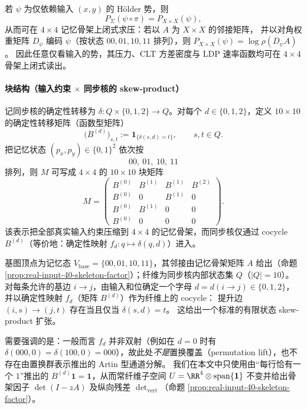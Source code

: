 \begin{corollary}[输入势的降维原则]\label{cor:real-input-40-input-potential-reduction}
若 $\psi$ 为仅依赖输入 $(x,y)$ 的 Hölder 势，则
\[
P_\Sigma(\psi\circ\pi)=P_{X\times X}(\psi),
\]
从而可在 $4\times 4$ 记忆骨架上闭式求压：若以 $A$ 为 $X\times X$ 的邻接矩阵，
并以对角权重矩阵 $D_\psi$ 编码 $\psi$（按状态 $00,01,10,11$ 排列），则
\(
P_{X\times X}(\psi)=\log\rho(D_\psi A)
\)。
因此任意仅看输入的势，其压力、CLT 方差密度与 LDP 速率函数均可在 $4\times 4$ 骨架上闭式读出。
\end{corollary}

\paragraph{块结构（输入约束 $\times$ 同步核的 skew-product）}
记同步核的确定性转移为 $\delta:Q\times\{0,1,2\}\to Q$。对每个 $d\in\{0,1,2\}$，定义 $10\times 10$ 的确定性转移矩阵（函数型矩阵）
\[
\bigl(B^{(d)}\bigr)_{s,t}:=\mathbf{1}_{\{\delta(s,d)=t\}},
\qquad s,t\in Q.
\]
把记忆状态 $(p_x,p_y)\in\{0,1\}^2$ 依次按
\[
00,\ 01,\ 10,\ 11
\]
排列，则 $M$ 可写成 $4\times 4$ 的 $10\times 10$ 块矩阵
\[
M=
\begin{pmatrix}
B^{(0)} & B^{(1)} & B^{(1)} & B^{(2)}\\
B^{(0)} & 0   & B^{(1)} & 0\\
B^{(0)} & B^{(1)} & 0   & 0\\
B^{(0)} & 0   & 0   & 0
\end{pmatrix}.
\]
该表示把全部真实输入约束压缩到 $4\times 4$ 的记忆骨架，而同步核仅通过 cocycle $B^{(d)}$（等价地：确定性映射 $f_d:q\mapsto\delta(q,d)$）进入。

\begin{remark}\label{rem:real-input-40-deterministic-lift}
基图顶点为记忆态 \(V_{\mathrm{base}}=\{00,01,10,11\}\)，其邻接由记忆骨架矩阵 \(A\) 给出（命题 \ref{prop:real-input-40-skeleton-factor}）；纤维为同步核内部状态集 \(Q\)（\(|Q|=10\)）。
对每条允许的基边 \(i\to j\)，由输入和位确定一个字母 \(d=d(i\to j)\in\{0,1,2\}\)，并以确定性映射 \(f_d\)（矩阵 \(B^{(d)}\)）作为纤维上的 cocycle：
提升边 \((i,s)\to(j,t)\) 存在当且仅当 \(\delta(s,d)=t\)。
这给出一个标准的有限状态 skew-product 扩张。
\par
需要强调的是：一般而言 \(f_d\) 并非双射（例如在 $d=0$ 时有 \(\delta(000,0)=\delta(100,0)=000\)），故此处\emph{不是}置换覆盖（permutation lift），也不存在由置换群表示推出的 Artin 型通道分解。
我们在本文中只使用由“每行恰有一个 $1$”推出的 \(B^{(d)}\mathbf{1}=\mathbf{1}\)，从而常纤维子空间
\(
U=\RR^{4}\otimes \mathrm{span}\{\mathbf{1}\}
\)
不变并给出骨架因子 \(\det(I-zA)\) 及纵向残差 \(\det_{\mathrm{vert}}\)（命题 \ref{prop:real-input-40-skeleton-factor}）。
\end{remark}

